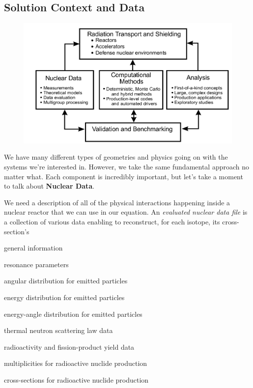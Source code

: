 \documentclass[12pt]{article}
\begin{document}
\subsection*{Solution Context and Data}%
\begin{figure}[h!]
    \begin{center}
    \includegraphics[keepaspectratio, width = 4.5 in]{solver-map}
    \end{center}
    \label{fig:context}
\end{figure}
%
We have many different types of geometries and physics going on with the systems we're interested in. However, we take the same fundamental approach no matter what. Each component is incredibly important, but let's take a moment to talk about \textbf{Nuclear Data}.

We need a description of all of the physical interactions happening inside a nuclear reactor that we can use in our equation. An \textit{evaluated nuclear data file} is a collection of various data enabling to reconstruct, for each isotope, its cross-section's 
\begin{compactitem}
\item general information
\item resonance parameters 
\item angular distribution for emitted particles 
\item energy distribution for emitted particles 
\item energy-angle distribution for emitted particles 
\item thermal neutron scattering law data 
\item radioactivity and fission-product yield data 
\item multiplicities for radioactive nuclide production 
\item cross-sections for radioactive nuclide production
\end{compactitem}
\end{document}
